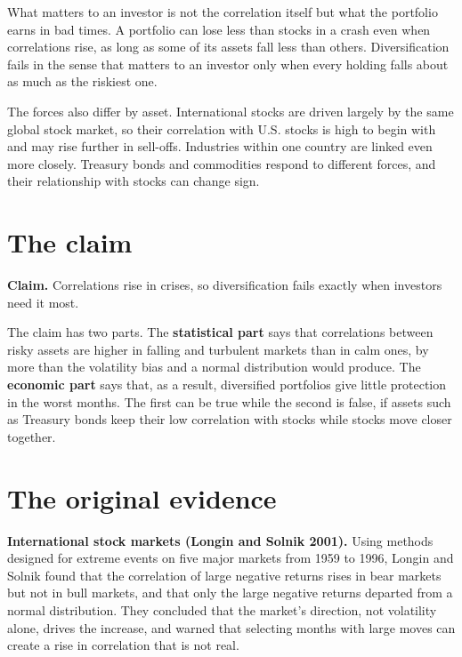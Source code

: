 What matters to an investor is not the correlation itself but what the portfolio earns in bad times. A portfolio can lose less than stocks in a crash even when correlations rise, as long as some of its assets fall less than others. Diversification fails in the sense that matters to an investor only when every holding falls about as much as the riskiest one.

The forces also differ by asset. International stocks are driven largely by the same global stock market, so their correlation with U.S. stocks is high to begin with and may rise further in sell-offs. Industries within one country are linked even more closely. Treasury bonds and commodities respond to different forces, and their relationship with stocks can change sign.


\section{The claim}
\label{sec:13-claim}

\begin{callout}
\textbf{Claim.} Correlations rise in crises, so diversification fails exactly when investors need it most.
\end{callout}

The claim has two parts. The \textbf{statistical part} says that correlations between risky assets are higher in falling and turbulent markets than in calm ones, by more than the volatility bias and a normal distribution would produce. The \textbf{economic part} says that, as a result, diversified portfolios give little protection in the worst months. The first can be true while the second is false, if assets such as Treasury bonds keep their low correlation with stocks while stocks move closer together.

\section{The original evidence}
\label{sec:13-evidence}

\textbf{International stock markets (Longin and Solnik 2001).} Using methods designed for extreme events on five major markets from 1959 to 1996, Longin and Solnik found that the correlation of large negative returns rises in bear markets but not in bull markets, and that only the large negative returns departed from a normal distribution. They concluded that the market's direction, not volatility alone, drives the increase, and warned that selecting months with large moves can create a rise in correlation that is not real.

